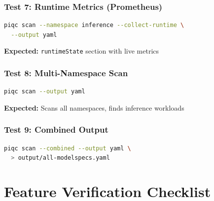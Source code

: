 \documentclass[11pt,a4paper]{article}
\begin{document}
\subsubsection{Test 7: Runtime Metrics (Prometheus)}
\begin{lstlisting}[language=bash]
piqc scan --namespace inference --collect-runtime \
  --output yaml
\end{lstlisting}
\textbf{Expected:} \texttt{runtimeState} section with live metrics

\subsubsection{Test 8: Multi-Namespace Scan}
\begin{lstlisting}[language=bash]
piqc scan --output yaml
\end{lstlisting}
\textbf{Expected:} Scans all namespaces, finds inference workloads

\subsubsection{Test 9: Combined Output}
\begin{lstlisting}[language=bash]
piqc scan --combined --output yaml \
  > output/all-modelspecs.yaml
\end{lstlisting}

\section{Feature Verification Checklist}
\end{document}
